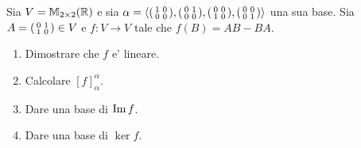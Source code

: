 \begin{example}
    Sia $V = \mathbb{M}_{2\times 2}(\mathbb{R})$ e sia $\alpha = \left\langle \begin{psmallmatrix}1&0\\0&0\end{psmallmatrix}, \begin{psmallmatrix}0&1\\0&0\end{psmallmatrix}, \begin{psmallmatrix}0&0\\1&0\end{psmallmatrix}, \begin{psmallmatrix}0&0\\0&1\end{psmallmatrix} \right\rangle$ una sua base.    
    Sia $A = \begin{psmallmatrix}0&1\\1&0\end{psmallmatrix} \in V$ e $f : V \to V$ tale che $f(B) = AB - BA$.
    \begin{enumerate}
        \item Dimostrare che $f$ e' lineare.
        \item Calcolare $[f]^{\alpha}_{\alpha}$.
        \item Dare una base di $\operatorname{Im}f$.
        \item Dare una base di $\ker f$.
    \end{enumerate}
\end{example}
